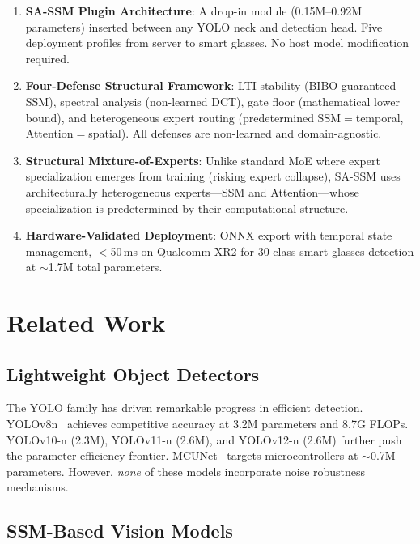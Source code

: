 \documentclass[conference]{IEEEtran}
\begin{document}
\begin{enumerate}
\item \textbf{SA-SSM Plugin Architecture}: A drop-in module (0.15M--0.92M parameters) inserted between any YOLO neck and detection head. Five deployment profiles from server to smart glasses. No host model modification required.

\item \textbf{Four-Defense Structural Framework}: LTI stability (BIBO-guaranteed SSM), spectral analysis (non-learned DCT), gate floor (mathematical lower bound), and heterogeneous expert routing (predetermined SSM$=$temporal, Attention$=$spatial). All defenses are non-learned and domain-agnostic.

\item \textbf{Structural Mixture-of-Experts}: Unlike standard MoE where expert specialization emerges from training (risking expert collapse), SA-SSM uses architecturally heterogeneous experts---SSM and Attention---whose specialization is predetermined by their computational structure.

\item \textbf{Hardware-Validated Deployment}: ONNX export with temporal state management, $<$50\,ms on Qualcomm XR2 for 30-class smart glasses detection at ${\sim}$1.7M total parameters.
\end{enumerate}

\section{Related Work}

\subsection{Lightweight Object Detectors}

The YOLO family has driven remarkable progress in efficient detection. YOLOv8n~\cite{jocher2023yolov8} achieves competitive accuracy at 3.2M parameters and 8.7G FLOPs. YOLOv10-n (2.3M), YOLOv11-n (2.6M), and YOLOv12-n (2.6M) further push the parameter efficiency frontier. MCUNet~\cite{lin2020mcunet} targets microcontrollers at ${\sim}$0.7M parameters. However, \emph{none} of these models incorporate noise robustness mechanisms.

\subsection{SSM-Based Vision Models}
\end{document}

